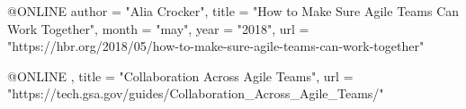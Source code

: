 

@ONLINE {
    author = "Alia Crocker",
    title  = "How to Make Sure Agile Teams Can Work Together",
    month  = "may",
    year   = "2018",
    url    = "https://hbr.org/2018/05/how-to-make-sure-agile-teams-can-work-together"
}

@ONLINE {,
    title = "Collaboration Across Agile Teams",
    url   = "https://tech.gsa.gov/guides/Collaboration_Across_Agile_Teams/"
}